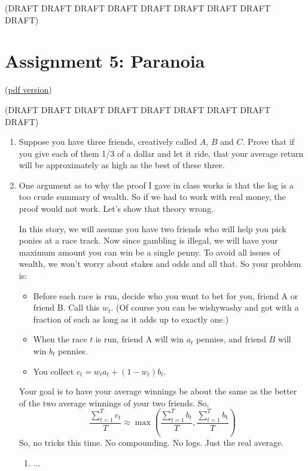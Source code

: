 \documentclass[11pt]{article}
\begin{document}
(DRAFT DRAFT DRAFT DRAFT DRAFT DRAFT DRAFT DRAFT DRAFT)

\section*{Assignment 5: Paranoia}

(\href{assignment5.pdf}{pdf version}) 

(DRAFT DRAFT DRAFT DRAFT DRAFT DRAFT DRAFT DRAFT DRAFT)


\begin{enumerate}
\item Suppose you have three friends, creatively called $A$, $B$ and
$C$.  Prove that if you give each of them 1/3 of a dollar and let it
ride, that your average return will be approximately as high as the
best of these three.

\item One argument as to why the proof I gave in class works is that
the log is a too crude summary of wealth.  So if we had to work with
real money, the proof would not work.  Let's show that theory wrong.

In this story, we will assume you have two friends who will help you
pick ponies at a race track.  Now since gambling is illegal, we will
have your maximum amount you can win be a single penny.  To avoid all
issues of wealth, we won't worry about stakes and odds and all that.
So your problem is:

\begin{itemize}
\item Before each race is run, decide who you want to bet for you,
 friend A or friend B.  Call this $w_t$.  (Of course you can be
 wishywashy and got with a fraction of each as long as it adds up to
 exactly one.)
\item When the race $t$ is run, friend A will win $a_t$ pennies, and
friend $B$ will win $b_t$ pennies.
\item You collect $c_t = w_t a_t + (1-w_t) b_t$.
\end{itemize}

Your goal is to have your average winnings be about the same as the
better of the two average winnings of your two friends.  So,
\begin{displaymath}
\frac{\sum_{t=1}^T c_t}{T} \approx \max(\frac{\sum_{t=1}^T b_t}{T},\frac{\sum_{t=1}^T b_t}{T})
\end{displaymath}
So, no tricks this time.  No compounding.  No logs.  Just the real
average. 
\begin{enumerate}
\item ...
\end{enumerate}


\end{enumerate}
\end{document}

